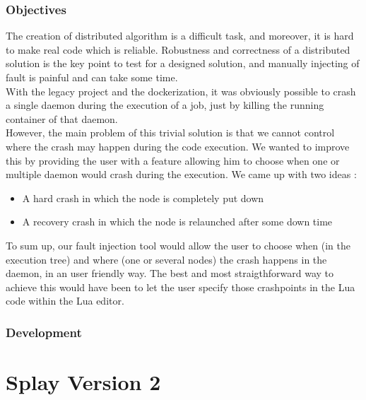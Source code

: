 \documentclass{eplmastersthesis}
\begin{document}
      \subsection{Objectives}
        The creation of distributed algorithm is a difficult task, and
        moreover, it is hard to make real code which is reliable. Robustness
        and correctness of a distributed solution is the key point to test
        for a designed solution, and manually injecting of fault is painful
        and can take some time. \\

        With the legacy project and the dockerization, it was obviously
        possible to crash a single daemon during the execution of a job, just
        by killing the running container of that daemon.\\
        However, the main problem of this trivial solution is that we cannot
        control where the crash may happen during the code execution.
        We wanted to improve this by providing the user with a feature
        allowing him to choose when one or multiple daemon would crash during
        the execution. We came up with two ideas :

        \begin{itemize}
          \item A hard crash in which the node is completely put down
          \item A recovery crash in which the node is relaunched after some
          down time
        \end{itemize}

        To sum up, our fault injection tool would allow the user to choose
        when (in the execution tree) and where (one or several nodes) the
        crash happens in the daemon, in an user friendly way. The best and
        most straigthforward way to achieve this would have been to let
        the user specify those crashpoints in the Lua code within the Lua
        editor.
      \subsection{Development}
      
  \chapter{Splay Version 2}

\end{document}
